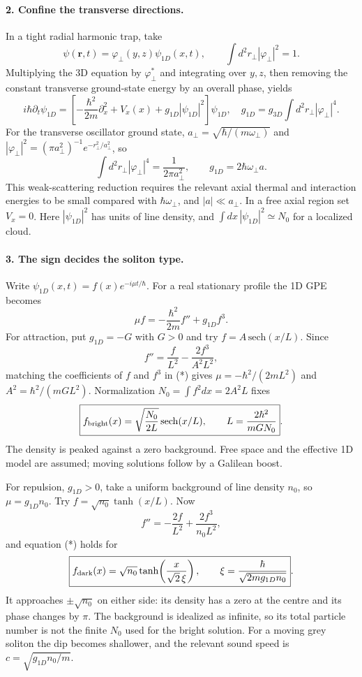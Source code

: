 \documentclass[11pt,a4paper]{article}
\begin{document}
\paragraph{2. Confine the transverse directions.}
In a tight radial harmonic trap, take
\[
\psi(\mathbf r,t)=\varphi_\perp(y,z)\psi_{1D}(x,t),\qquad
\int d^2r_\perp|\varphi_\perp|^2=1.
\]
Multiplying the 3D equation by $\varphi_\perp^*$ and integrating over $y,z$, then removing the constant transverse ground-state energy by an overall phase, yields
\[
i\hbar\partial_t\psi_{1D}=\left[-\frac{\hbar^2}{2m}\partial_x^2+V_x(x)+g_{1D}|\psi_{1D}|^2\right]\psi_{1D},
\quad g_{1D}=g_{3D}\int d^2r_\perp|\varphi_\perp|^4.
\]
For the transverse oscillator ground state, $a_\perp=\sqrt{\hbar/(m\omega_\perp)}$ and $|\varphi_\perp|^2=(\pi a_\perp^2)^{-1}e^{-r_\perp^2/a_\perp^2}$, so
\[
\int d^2r_\perp|\varphi_\perp|^4=\frac1{2\pi a_\perp^2},\qquad
\boxed{g_{1D}=2\hbar\omega_\perp a}.
\]
This weak-scattering reduction requires the relevant axial thermal and interaction energies to be small compared with $\hbar\omega_\perp$, and $|a|\ll a_\perp$. In a free axial region set $V_x=0$. Here $|\psi_{1D}|^2$ has units of line density, and $\int dx\,|\psi_{1D}|^2\simeq N_0$ for a localized cloud.

\paragraph{3. The sign decides the soliton type.}
Write $\psi_{1D}(x,t)=f(x)e^{-i\mu t/\hbar}$. For a real stationary profile the 1D GPE becomes
\[
\mu f=-\frac{\hbar^2}{2m}f''+g_{1D}f^3.\tag{*}
\]
For attraction, put $g_{1D}=-G$ with $G>0$ and try $f=A\,\mathrm{sech}(x/L)$. Since
\[
f''=\frac f{L^2}-\frac{2f^3}{A^2L^2},
\]
matching the coefficients of $f$ and $f^3$ in (*) gives $\mu=-\hbar^2/(2mL^2)$ and $A^2=\hbar^2/(mGL^2)$. Normalization $N_0=\int f^2dx=2A^2L$ fixes
\[
\boxed{f_{\rm bright}(x)=\sqrt{\frac{N_0}{2L}}\,\mathrm{sech}(x/L),\qquad
L=\frac{2\hbar^2}{mGN_0}}.
\]
The density is peaked against a zero background. Free space and the effective 1D model are assumed; moving solutions follow by a Galilean boost.

For repulsion, $g_{1D}>0$, take a uniform background of line density $n_0$, so $\mu=g_{1D}n_0$. Try $f=\sqrt{n_0}\tanh(x/L)$. Now
\[
f''=-\frac{2f}{L^2}+\frac{2f^3}{n_0L^2},
\]
and equation (*) holds for
\[
\boxed{f_{\rm dark}(x)=\sqrt{n_0}\tanh\!\left(\frac{x}{\sqrt2\,\xi}\right),\qquad
\xi=\frac{\hbar}{\sqrt{2mg_{1D}n_0}}}.
\]
It approaches $\pm\sqrt{n_0}$ on either side: its density has a zero at the centre and its phase changes by $\pi$. The background is idealized as infinite, so its total particle number is not the finite $N_0$ used for the bright solution. For a moving grey soliton the dip becomes shallower, and the relevant sound speed is $c=\sqrt{g_{1D}n_0/m}$.
\end{document}
